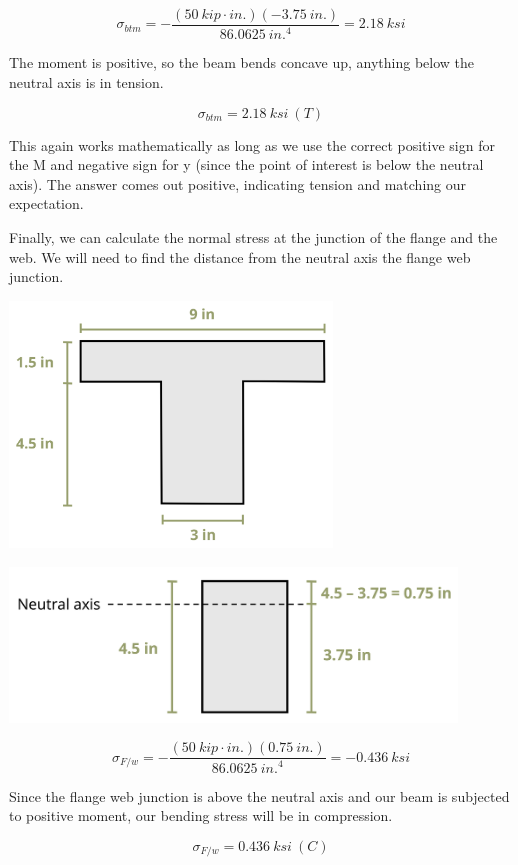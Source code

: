 \documentclass[
  letterpaper,
  DIV=11,
  numbers=noendperiod]{scrreprt}
\theoremstyle{definition}
\theoremstyle{remark}
\begin{document}
\begin{tcolorbox}
\begin{tcolorbox}
\[
\sigma_{btm}=-\frac{(50{~kip}\cdot{in.})(-3.75{~in.})}{86.0625{~in.}^4}=2.18{~ksi}
\]

The moment is positive, so the beam bends concave up, anything below the
neutral axis is in tension.

\[
\sigma_{btm}=2.18{~ksi}~(T)
\]

This again works mathematically as long as we use the correct positive
sign for the M and negative sign for y (since the point of interest is
below the neutral axis). The answer comes out positive, indicating
tension and matching our expectation.

Finally, we can calculate the normal stress at the junction of the
flange and the web. We will need to find the distance from the neutral
axis the flange web junction.

\begin{center}
\includegraphics[width=3.375in,height=\textheight]{images/CH9 PNGs/Example 9.1 part 5.png}
\end{center}

\begin{center}
\includegraphics[width=4.67708in,height=\textheight]{images/CH9 PNGs/Example 9.1 part 6.png}
\end{center}

\[
\sigma_{F / w}=-\frac{(50{~kip}\cdot{in.})(0.75{~in.})}{86.0625{~in.}^4}=-0.436{~ksi}
\]

Since the flange web junction is above the neutral axis and our beam is
subjected to positive moment, our bending stress will be in compression.

\[
\sigma_{F/w}=0.436{~ksi}~(C)
\]

\end{tcolorbox}

\end{tcolorbox}
\end{document}
